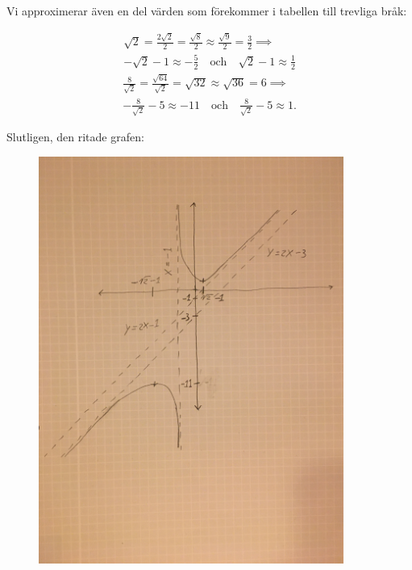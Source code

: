 \documentclass{article}
\begin{document}
\newpage

\noindent Vi approximerar även en del värden som förekommer i tabellen till trevliga bråk:

\begin{gather*}
  \sqrt{2} = \frac{2\sqrt{2}}{2} = \frac{\sqrt{8}}{2} \approx \frac{\sqrt{9}}{2} = \frac{3}{2} \implies\\
  -\sqrt{2} - 1 \approx -\frac{5}{2} \quad \text{och} \quad \sqrt{2} - 1 \approx \frac{1}{2}
\end{gather*}\begin{gather*}
  \frac{8}{\sqrt{2}} = \frac{\sqrt{64}}{\sqrt{2}} = \sqrt{32} \approx \sqrt{36} = 6 \implies\\
  -\frac{8}{\sqrt{2}} - 5 \approx -11 \quad \text{och} \quad \frac{8}{\sqrt{2}} - 5 \approx 1\text{.}
\end{gather*}

Slutligen, den ritade grafen:
\begin{figure}[h]
  \centering
  \includegraphics[width=10cm, angle=270]{skiss.jpg}
\end{figure}
\end{document}
